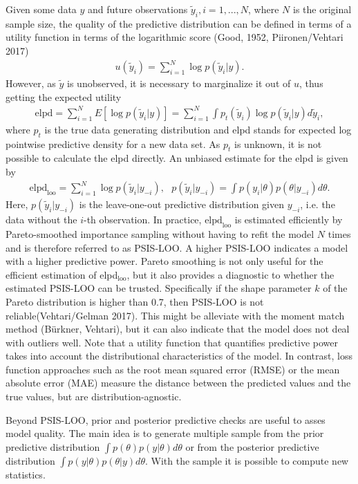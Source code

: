 Given some data $y$ and future observations $\tilde y_i, i = 1, ..., N$, where $N$ is the original sample size, the quality of the predictive distribution can be defined in terms of a utility function in terms of the logarithmic score (Good, 1952, Piironen/Vehtari 2017)
\begin{gather*}
    u(\tilde y_i) = \displaystyle \sum_{i = 1}^N\log p(\tilde y_i|y).
\end{gather*}
However, as $\tilde y$ is unobserved, it is necessary to marginalize it out of $u$, thus getting the expected utility
\begin{gather*}
    \text{elpd} =
    \displaystyle \sum_{i = 1}^N E[\log p(\tilde y_i| y)] =
    \displaystyle \sum_{i = 1}^N \int p_t(\tilde y_i) \log p(\tilde y_i| y) d \tilde y_i,
\end{gather*}
where $p_t$ is the true data generating distribution and elpd stands for expected log pointwise predictive density for a new data set.
As $p_t$ is unknown, it is not possible to calculate the elpd directly.
An unbiased estimate for the elpd is given by
\begin{gather}
    \text{elpd}_{\text{loo}} =
    \displaystyle \sum_{i = 1}^N \log p(\tilde y_i| y_{-i}),
    ~~~ p(\tilde y_i| y_{-i}) = \displaystyle \int p(y_i | \theta)p(\theta|y_{-i})d\theta.
\end{gather}
Here, $p(\tilde y_i| y_{-i})$ is the leave-one-out predictive distribution given $y_{-i}$, i.e. the data without the $i$-th observation.
In practice, $\text{elpd}_{\text{loo}}$ is estimated efficiently by Pareto-smoothed importance sampling without having to refit the model $N$ times and is therefore referred to as PSIS-LOO.
A higher PSIS-LOO indicates a model with a higher predictive power.
Pareto smoothing is not only useful for the efficient estimation of elpd$_{\text{loo}}$, but it also provides a diagnostic to whether the estimated PSIS-LOO can be trusted.
Specifically if the shape parameter $k$ of the Pareto distribution is higher than 0.7, then PSIS-LOO is not reliable(Vehtari/Gelman 2017).
This might be alleviate with the moment match method (Bürkner, Vehtari), but it can also indicate that the model does not deal with outliers well.
Note that a utility function that quantifies predictive power takes into account the distributional characteristics of the model.
In contrast, loss function approaches such as the root mean squared error (RMSE) or the mean absolute error (MAE) measure the distance between the predicted values and the true values, but are distribution-agnostic.

Beyond PSIS-LOO, prior and posterior predictive checks are useful to asses model quality.
The main idea is to generate multiple sample from the prior predictive distribution $\int p(\theta) p(y|\theta)d\theta$ or from the posterior predictive distribution $\int p(y | \theta) p(\theta|y) d\theta$.
With the sample it is possible to compute new statistics.


